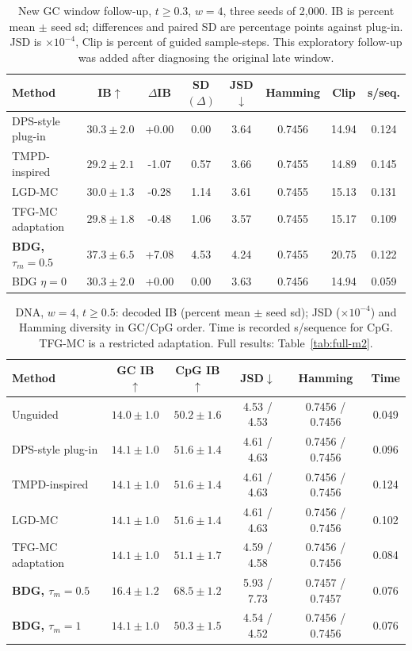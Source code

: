 \documentclass{article}
\begin{document}
\begin{table}[!htbp]
\centering\small
\caption{New GC window follow-up, $t\ge0.3$, $w=4$, three seeds of 2,000. IB is percent mean $\pm$ seed sd; differences and paired SD are percentage points against plug-in. JSD is $\times10^{-4}$, Clip is percent of guided sample-steps. This exploratory follow-up was added after diagnosing the original late window.}
\label{tab:m2-window}
\begin{tabular}{lccccccc}
\toprule
Method & IB$\uparrow$ & $\Delta$IB & SD$(\Delta)$ & JSD$\downarrow$ & Hamming & Clip & s/seq.\\
\midrule
DPS-style plug-in & $30.3\pm2.0$ & +0.00 & 0.00 & 3.64 & 0.7456 & 14.94 & 0.124\\
TMPD-inspired & $29.2\pm2.1$ & -1.07 & 0.57 & 3.66 & 0.7455 & 14.89 & 0.145\\
LGD-MC & $30.0\pm1.3$ & -0.28 & 1.14 & 3.61 & 0.7455 & 15.13 & 0.131\\
TFG-MC adaptation & $29.8\pm1.8$ & -0.48 & 1.06 & 3.57 & 0.7455 & 15.17 & 0.109\\
\textbf{BDG, $\tau_m=0.5$} & $37.3\pm6.5$ & +7.08 & 4.53 & 4.24 & 0.7455 & 20.75 & 0.122\\
BDG $\eta=0$ & $30.3\pm2.0$ & +0.00 & 0.00 & 3.63 & 0.7456 & 14.94 & 0.059\\
\bottomrule
\end{tabular}
\end{table}
\begin{table}[!htbp]
\centering\small\setlength{\tabcolsep}{4pt}
\caption{DNA, $w=4$, $t\ge0.5$: decoded IB (percent mean $\pm$ seed sd); JSD ($\times10^{-4}$) and Hamming diversity in GC/CpG order. Time is recorded s/sequence for CpG. TFG-MC is a restricted adaptation. Full results: Table~\ref{tab:full-m2}.}
\label{tab:m2-late}
\begin{tabular}{lccccc}
\toprule
Method & GC IB$\uparrow$ & CpG IB$\uparrow$ & JSD$\downarrow$ & Hamming & Time\\
\midrule
Unguided & $14.0\pm1.0$ & $50.2\pm1.6$ & 4.53 / 4.53 & 0.7456 / 0.7456 & 0.049\\
DPS-style plug-in & $14.1\pm1.0$ & $51.6\pm1.4$ & 4.61 / 4.63 & 0.7456 / 0.7456 & 0.096\\
TMPD-inspired & $14.1\pm1.0$ & $51.6\pm1.4$ & 4.61 / 4.63 & 0.7456 / 0.7456 & 0.124\\
LGD-MC & $14.1\pm1.0$ & $51.6\pm1.4$ & 4.61 / 4.63 & 0.7456 / 0.7456 & 0.102\\
TFG-MC adaptation & $14.1\pm1.0$ & $51.1\pm1.7$ & 4.59 / 4.58 & 0.7456 / 0.7456 & 0.084\\
\textbf{BDG, $\tau_m=0.5$} & $16.4\pm1.2$ & $68.5\pm1.2$ & 5.93 / 7.73 & 0.7457 / 0.7457 & 0.076\\
\textbf{BDG, $\tau_m=1$} & $14.1\pm1.0$ & $50.3\pm1.5$ & 4.54 / 4.52 & 0.7456 / 0.7456 & 0.076\\
\bottomrule
\end{tabular}
\end{table}
\end{document}
